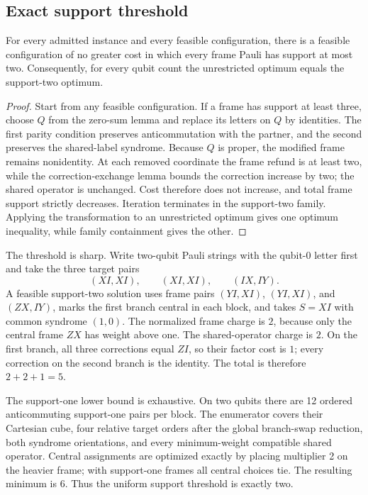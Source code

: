 \subsection{Exact support threshold}
\begin{theorem}
For every admitted instance and every feasible configuration, there is a feasible configuration of no greater cost in which every frame Pauli has support at most two. Consequently, for every qubit count the unrestricted optimum equals the support-two optimum.
\end{theorem}
\begin{proof}
Start from any feasible configuration. If a frame has support at least three, choose $Q$ from the zero-sum lemma and replace its letters on $Q$ by identities. The first parity condition preserves anticommutation with the partner, and the second preserves the shared-label syndrome. Because $Q$ is proper, the modified frame remains nonidentity. At each removed coordinate the frame refund is at least two, while the correction-exchange lemma bounds the correction increase by two; the shared operator is unchanged. Cost therefore does not increase, and total frame support strictly decreases. Iteration terminates in the support-two family. Applying the transformation to an unrestricted optimum gives one optimum inequality, while family containment gives the other.
\end{proof}

The threshold is sharp. Write two-qubit Pauli strings with the qubit-0 letter first and take the three target pairs
\[
(XI,XI),\qquad (XI,XI),\qquad (IX,IY).
\]
A feasible support-two solution uses frame pairs $(YI,XI)$, $(YI,XI)$, and $(ZX,IY)$, marks the first branch central in each block, and takes $S=XI$ with common syndrome $(1,0)$. The normalized frame charge is $2$, because only the central frame $ZX$ has weight above one. The shared-operator charge is $2$. On the first branch, all three corrections equal $ZI$, so their factor cost is $1$; every correction on the second branch is the identity. The total is therefore $2+2+1=5$.

The support-one lower bound is exhaustive. On two qubits there are 12 ordered anticommuting support-one pairs per block. The enumerator covers their Cartesian cube, four relative target orders after the global branch-swap reduction, both syndrome orientations, and every minimum-weight compatible shared operator. Central assignments are optimized exactly by placing multiplier 2 on the heavier frame; with support-one frames all central choices tie. The resulting minimum is $6$. Thus the uniform support threshold is exactly two.

